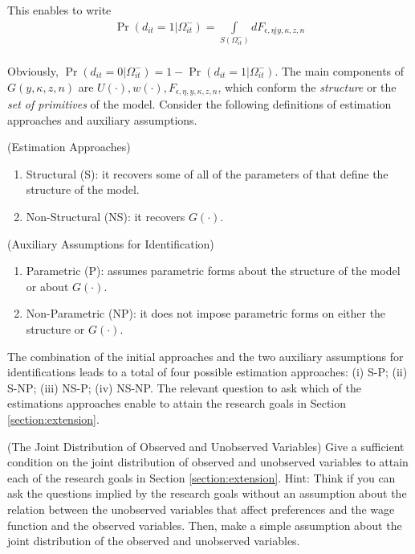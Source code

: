 \indent This enables to write
\begin{eqnarray}
\Pr \left( d_{it} = 1 | \Omega_{it}^{-} \right) = \int \limits _{S \left(  \Omega_{it}^- \right)} d F _{\epsilon, \eta |  y, \kappa, z, n} \\
\end{eqnarray}

\noindent Obviously, $\Pr \left( d_{it} = 0 | \Omega_{it}^- \right) = 1 - \Pr \left( d_{it} = 1 | \Omega_{it}^- \right)$. The main components of $G \left( y, \kappa, z, n \right)$ are $U(\cdot), w(\cdot), F _{\epsilon, \eta,  y, \kappa, z, n}$, which conform the \emph{structure} or the \emph{set of primitives} of the model. Consider the following definitions of estimation approaches and auxiliary assumptions.

\begin{definition} (Estimation Approaches) \label{definition:ea}
\begin{enumerate}
\item Structural (S): it recovers some of all of the parameters of that define the structure of the model.
\item Non-Structural (NS): it recovers $G(\cdot)$.
\end{enumerate}
\end{definition}

\begin{definition} (Auxiliary Assumptions for Identification) \label{definition:aa}
\begin{enumerate}
\item Parametric (P): assumes parametric forms about the structure of the model or about $G(\cdot)$.
\item Non-Parametric (NP): it does not impose parametric forms on either the structure or $G(\cdot)$.
\end{enumerate}
\end{definition}

\indent The combination of the initial approaches and the two auxiliary assumptions for identifications leads to a total of four possible estimation approaches: (i) S-P; (ii) S-NP; (iii) NS-P; (iv) NS-NP. The relevant question to ask which of the estimations approaches enable to attain the research goals in Section \ref{section:extension}.

\begin{exercise} (The Joint Distribution of Observed and Unobserved Variables)
Give a sufficient condition on the joint distribution of observed and unobserved variables to attain each of the research goals in Section \ref{section:extension}. Hint: Think if you can ask the questions implied by the research goals without an assumption about the relation between the unobserved variables that affect preferences and the wage function and the observed variables. Then, make a simple assumption about the joint distribution of the observed and unobserved variables.
\end{exercise}

